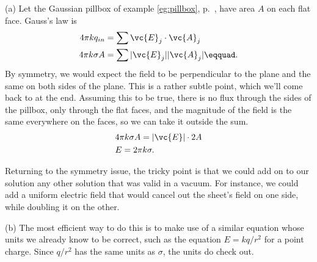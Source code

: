 (a) Let the Gaussian pillbox of example \ref{eg:pillbox}, p.~\pageref{eg:pillbox}, have
area $A$ on each flat face. Gauss's law is
\begin{align*}
        4\pi k q_{in}        &= \sum \vc{E}_j\cdot\vc{A}_j \\
        4\pi k \sigma A        &= \sum |\vc{E}_j||\vc{A}_j|\eqquad.
\end{align*}
By symmetry, we would expect the field to be perpendicular to the plane and
the same on both sides of the plane. This
is a rather subtle point, which we'll come back to at the end. Assuming this to be true,
there is no flux through the sides of the pillbox, only through the flat faces, and
the magnitude of the field is the same everywhere on the faces, so we can take it outside the sum.
\begin{align*}
        &4\pi k \sigma A        = |\vc{E}|\cdot 2 A \\
        &E = 2\pi k \sigma.
\end{align*}

Returning to the symmetry issue, the tricky point is that we could add on to our solution
any other solution that was valid in a vacuum. For instance, we could add a uniform electric
field that would cancel out the sheet's field on one side, while doubling it on the other.

(b) The most efficient way to do this is to make use of a similar equation whose units
we already know to be correct, such as the equation $E=kq/r^2$ for a point charge.
Since $q/r^2$ has the same units as $\sigma$, the units do check out.
